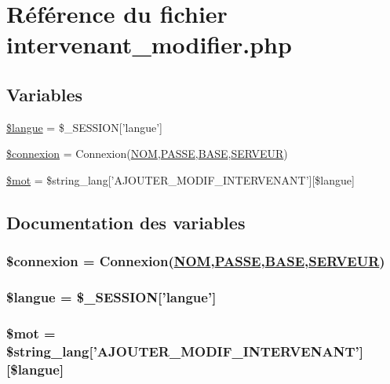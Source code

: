 \hypertarget{intervenant__modifier_8php}{
\section{R\'{e}f\'{e}rence du fichier intervenant\_\-modifier.php}
\label{intervenant__modifier_8php}
}
\subsection*{Variables}
\begin{CompactItemize}
\item 
\hyperlink{intervenant__modifier_8php_a0}{\$langue} = \$\_\-SESSION\mbox{[}'langue'\mbox{]}
\item 
\hyperlink{intervenant__modifier_8php_a1}{\$connexion} = Connexion(\hyperlink{pma__connect_8php_a0}{NOM},\hyperlink{pma__connect_8php_a1}{PASSE},\hyperlink{pma__connect_8php_a3}{BASE},\hyperlink{pma__connect_8php_a2}{SERVEUR})
\item 
\hyperlink{intervenant__modifier_8php_a2}{\$mot} = \$string\_\-lang\mbox{[}'AJOUTER\_\-MODIF\_\-INTERVENANT'\mbox{]}\mbox{[}\$langue\mbox{]}
\end{CompactItemize}


\subsection{Documentation des variables}
\hypertarget{intervenant__modifier_8php_a1}{
\subsubsection[\$connexion]{\setlength{\rightskip}{0pt plus 5cm}\$connexion = Connexion(\hyperlink{pma__connect_8php_a0}{NOM},\hyperlink{pma__connect_8php_a1}{PASSE},\hyperlink{pma__connect_8php_a3}{BASE},\hyperlink{pma__connect_8php_a2}{SERVEUR})}}
\label{intervenant__modifier_8php_a1}


\hypertarget{intervenant__modifier_8php_a0}{
\subsubsection[\$langue]{\setlength{\rightskip}{0pt plus 5cm}\$langue = \$\_\-SESSION\mbox{[}'langue'\mbox{]}}}
\label{intervenant__modifier_8php_a0}


\hypertarget{intervenant__modifier_8php_a2}{
\subsubsection[\$mot]{\setlength{\rightskip}{0pt plus 5cm}\$mot = \$string\_\-lang\mbox{[}'AJOUTER\_\-MODIF\_\-INTERVENANT'\mbox{]}\mbox{[}\$langue\mbox{]}}}
\label{intervenant__modifier_8php_a2}


